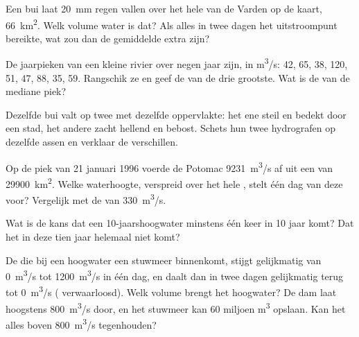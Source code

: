 \begin{exercise}[$\star\star$]\label{exo:g10:drainage-basins:7}
Een bui laat \qty{20}{mm} regen vallen over het hele  van de Varden
op de kaart, \qty{66}{km^2}. Welk volume water is dat? Als alles in twee dagen
het uitstroompunt bereikte, wat zou dan de gemiddelde extra  zijn?
\end{exercise}

\begin{exercise}[$\star\star$]\label{exo:g10:drainage-basins:8}
De jaarpieken van een kleine rivier over negen jaar zijn, in \unit{m^3/s}:
\num{42}, \num{65}, \num{38}, \num{120}, \num{51}, \num{47}, \num{88},
\num{35}, \num{59}. Rangschik ze en geef de  van de drie
grootste. Wat is de  van de mediane piek?
\end{exercise}

\begin{exercise}[$\star\star$]\label{exo:g10:drainage-basins:9}
Dezelfde bui valt op twee  met dezelfde oppervlakte: het ene steil
en bedekt door een stad, het andere zacht hellend en bebost. Schets hun twee
hydrografen op dezelfde assen en verklaar de verschillen.
\end{exercise}

\begin{exercise}[$\star\star$]\label{exo:g10:drainage-basins:10}
Op de piek van 21 januari 1996 voerde de Potomac \qty{9231}{m^3/s} af uit een
 van \qty{29900}{km^2}. Welke waterhoogte, verspreid over het hele
, stelt één dag van deze  voor? Vergelijk met de 
van \qty{330}{m^3/s}.
\end{exercise}

\begin{exercise}[$\star\star$]\label{exo:g10:drainage-basins:11}
Wat is de kans dat een \num{10}-jaarshoogwater minstens één keer in \num{10}
jaar komt? Dat het in deze tien jaar helemaal niet komt?
\end{exercise}

\begin{exercise}[$\star\star\star$]\label{exo:g10:drainage-basins:12}
De  die bij een hoogwater een stuwmeer binnenkomt, stijgt gelijkmatig van
\qty{0}{m^3/s} tot \qty{1200}{m^3/s} in één dag, en daalt dan in twee dagen
gelijkmatig terug tot \qty{0}{m^3/s} ( verwaarloosd). Welk volume
brengt het hoogwater? De dam laat hoogstens \qty{800}{m^3/s} door, en het stuwmeer
kan \num{60} miljoen \unit{m^3} opslaan. Kan het alles boven
\qty{800}{m^3/s} tegenhouden?
\end{exercise}

